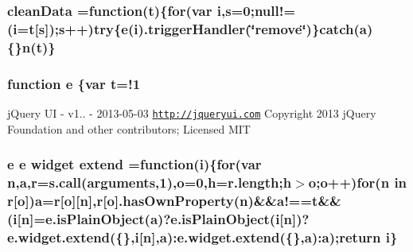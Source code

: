 \hypertarget{static_2root_2js_2jquery-ui_8custom_8min_8js_a69cf3a5538f71f728a82d0faf3b132c7}{
\subsubsection[{clean\-Data}]{ clean\-Data =function({\bf t})\{{\bf for}(var {\bf i},{\bf s}=0;null!=({\bf i}={\bf t}\mbox{[}{\bf s}\mbox{]});{\bf s}++){\bf try}\{{\bf e}({\bf i}).trigger\-Handler(\char`\"{}remove\char`\"{})\}catch({\bf a})\{\}{\bf n}({\bf t})\}}}\label{static_2root_2js_2jquery-ui_8custom_8min_8js_a69cf3a5538f71f728a82d0faf3b132c7}
\hypertarget{static_2root_2js_2jquery-ui_8custom_8min_8js_a2c038346d47955cbe2cb91e338edd7e1}{
\subsubsection[{e}]{\setlength{\rightskip}{0pt plus 5cm}function e \{var {\bf t}=!1}}\label{static_2root_2js_2jquery-ui_8custom_8min_8js_a2c038346d47955cbe2cb91e338edd7e1}
j\-Query U\-I -\/ v1.. -\/ 2013-\/05-\/03 \href{http://jqueryui.com}{\tt http\-://jqueryui.\-com} Copyright 2013 j\-Query Foundation and other contributors; Licensed M\-I\-T \hypertarget{static_2root_2js_2jquery-ui_8custom_8min_8js_af1e9b89a10c289e9c53907c6f0c3b595}{
\subsubsection[{extend}]{ {\bf e} {\bf e} {\bf widget} extend =function({\bf i})\{{\bf for}(var {\bf n},{\bf a},{\bf r}={\bf s.\-call}(arguments,1),{\bf o}=0,{\bf h}=r.\-length;{\bf h}$>${\bf o};{\bf o}++){\bf for}({\bf n} in {\bf r}\mbox{[}{\bf o}\mbox{]}){\bf a}={\bf r}\mbox{[}{\bf o}\mbox{]}\mbox{[}{\bf n}\mbox{]},{\bf r}\mbox{[}{\bf o}\mbox{]}.has\-Own\-Property({\bf n})\&\&a!=={\bf t}\&\&({\bf i}\mbox{[}{\bf n}\mbox{]}=e.\-is\-Plain\-Object({\bf a})?e.\-is\-Plain\-Object({\bf i}\mbox{[}{\bf n}\mbox{]})?e.\-widget.\-extend(\{\},{\bf i}\mbox{[}{\bf n}\mbox{]},{\bf a})\-:e.\-widget.\-extend(\{\},{\bf a})\-:{\bf a});return {\bf i}\}}}\label{static_2root_2js_2jquery-ui_8custom_8min_8js_af1e9b89a10c289e9c53907c6f0c3b595}

